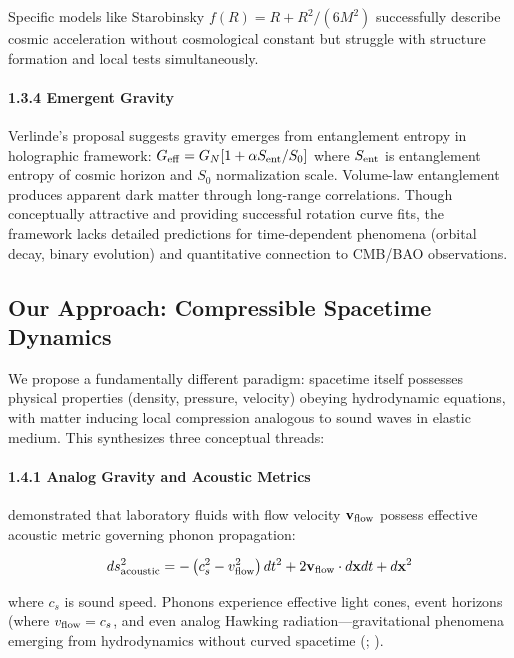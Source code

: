 \documentclass[10pt,a4paper]{article}
\begin{document}
Specific models like Starobinsky \(f(R) = R + R^2/(6M^2)\) successfully
describe cosmic acceleration without cosmological constant but struggle
with structure formation and local tests simultaneously.

\paragraph{1.3.4 Emergent Gravity}\label{emergent-gravity}

Verlinde's proposal \cite{Verlinde2011,Verlinde2017} suggests gravity emerges from
entanglement entropy in holographic framework:
\(G_{\rm eff} = G_N[1 + \alpha S_{\rm ent}/S_0]\) where \(S_{\rm ent}\)
is entanglement entropy of cosmic horizon and \(S_0\) normalization
scale. Volume-law entanglement produces apparent dark matter through
long-range correlations. Though conceptually attractive and providing
successful rotation curve fits, the framework lacks detailed predictions
for time-dependent phenomena (orbital decay, binary evolution) and
quantitative connection to CMB/BAO observations.

\subsection{Our Approach: Compressible Spacetime
Dynamics}\label{our-approach-compressible-spacetime-dynamics}

We propose a fundamentally different paradigm: spacetime itself
possesses physical properties (density, pressure, velocity) obeying
hydrodynamic equations, with matter inducing local compression analogous
to sound waves in elastic medium. This synthesizes three conceptual
threads:

\paragraph{1.4.1 Analog Gravity and Acoustic
Metrics}\label{analog-gravity-and-acoustic-metrics}

\cite{Unruh1981} demonstrated that laboratory fluids with flow velocity
\({\bf v}_{\rm flow}\) possess effective acoustic metric governing
phonon propagation:

\[ds^2_{\rm acoustic} = -\left(c_s^2 - v_{\rm flow}^2\right)dt^2 + 2{\bf v}_{\rm flow} \cdot d{\bf x} dt + d{\bf x}^2\]

where \(c_s\) is sound speed. Phonons experience effective light cones,
event horizons (where \(v_{\rm flow} = c_s\), and even analog Hawking
radiation---gravitational phenomena emerging from hydrodynamics without
curved spacetime (\cite{Barcelo2011}; \cite{Steinhauer2016}).
\end{document}
